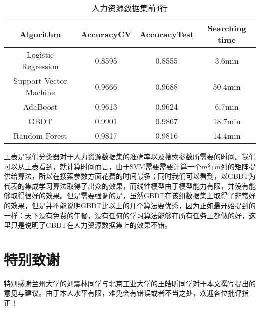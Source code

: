 \documentclass[UTF8, 12pt]{ctexart}
\begin{document}
\begin{table}[H]
	\centering
	\label{table2}
	\begin{tabular}{|c|c|c|c|}
		\hline
		Algorithm & AccuracyCV & AccuracyTest & Searching time\\
		\hline
		Logistic Regression & 0.8595 & 0.8555 & 3.6min\\
		Support Vector Machine & 0.9666 & 0.9688 & 50.4min\\
		AdaBoost & 0.9613 & 0.9624 & 6.7min\\
		GBDT & 0.9901 & 0.9867 & 18.7min\\
		Random Forest & 0.9817 & 0.9816 & 14.4min\\
		\hline
	\end{tabular}
	\caption{人力资源数据集前4行}
\end{table}

上表是我们分类器对于人力资源数据集的准确率以及搜索参数所需要的时间。我们可以从上表看到，就计算时间而言，由于SVM需要需要计算一个$m$行$m$列的矩阵提供给算法，所以在搜索参数方面花费的时间最多；同时我们可以看到，以GBDT为代表的集成学习算法取得了出众的效果，而线性模型由于模型能力有限，并没有能够取得很好的效果。但是需要强调的是，虽然GBDT在该组数据集上取得了非常好的效果，但是并不能说明GBDT比以上的几个算法要优秀，因为正如最开始提到的一样：天下没有免费的午餐，没有任何的学习算法能够在所有任务上都做的好，这里只是说明了GBDT在人力资源数据集上的效果不错。

\section{特别致谢}
特别感谢兰州大学的刘震林同学与北京工业大学的王皓昕同学对于本文撰写提出的意见与建议。由于本人水平有限，难免会有错误或者不当之处，欢迎各位批评指正！

  
 
\end{document}
